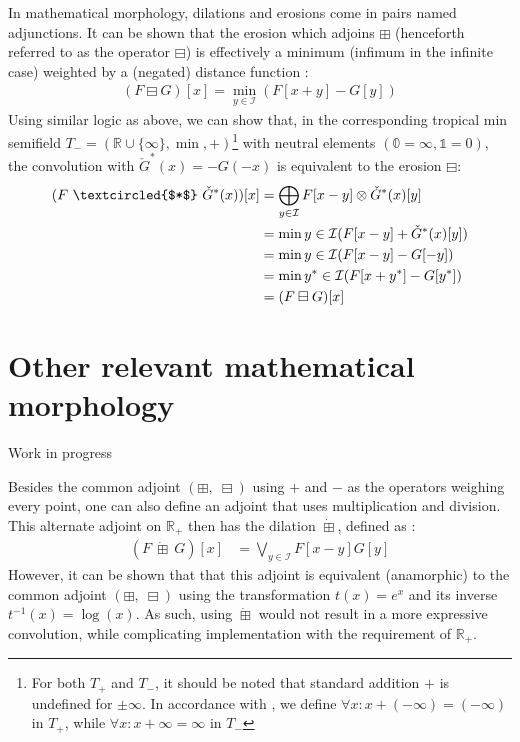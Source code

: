 \documentclass[a4paper, 12pt]{report}
\def\comment#1{\color{red}#1\color{black}}
\begin{document}
In mathematical morphology, dilations and erosions come in pairs named adjunctions. It can be shown that the erosion which adjoins $\boxplus$ (henceforth referred to as the operator $\boxminus$) is effectively a minimum (infimum in the infinite case) weighted by a (negated) distance function \cite{heijmans1996morphological}: 
\begin{align}
	(F \boxminus G)[x]=\min_{y\in \mathcal{I}}(F[x+y] - G[y])
\end{align}
\noindent
Using similar logic as above, we can show that, in the corresponding tropical min semifield $T_-=(\mathbb{R}\cup\{\infty\},\min,+)$\footnote{For both $T_+$ and $T_-$, it should be noted that standard addition $+$ is undefined for $\pm\infty$. In accordance with \cite{maragos}, we define $\forall x: x+(-\infty)=(-\infty)$ in $T_+$, while $\forall x: x+\infty=\infty$ in $T_-$} \cite{maragos} with neutral elements $(\mathbb{0}=\infty, \mathbb{1}=0)$, the convolution with $\check{G}^*(x)=-G(-x)$ is equivalent to the erosion $\boxminus$:
\begin{align}
	(F ~\textcircled{$*$}~ \check{G}^*(x))[x]
	&= \bigoplus_{y\in \mathcal{I}}F[x-y] \otimes \check{G}^*(x)[y] \\
	&= \min{y\in \mathcal{I}}(F[x-y] + \check{G}^*(x)[y]) \\
	&= \min{y\in \mathcal{I}}(F[x-y] - G[-y]) \\
	&= \min{y^*\in \mathcal{I}}(F[x+y^*] - G[y^*]) \\
	&= (F \boxminus G)[x]
\end{align}

\section{Other relevant mathematical morphology}
\comment{Work in progress}

Besides the common adjoint $(\boxplus,\; \boxminus)$ using $+$ and $-$ as the operators weighing every point, one can also define an adjoint that uses multiplication and division. This alternate adjoint on $\mathbb{R}_+$ then has the dilation $\dot \boxplus$, defined as \cite{heijmans1996morphological}:
\begin{align}
	(F~ \dot\boxplus~ G)[x] &= \bigvee_{y\in \mathcal{I}}F[x-y]G[y]
\end{align}
However, it can be shown that that this adjoint is equivalent (anamorphic) to the common adjoint $(\boxplus,\; \boxminus)$ using the transformation $t(x)=e^x$ and its inverse $t^{-1}(x)=\log(x)$. As such, using $\dot \boxplus$ would not result in a more expressive convolution, while complicating implementation with the requirement of $\mathbb{R}_+$.
\end{document}
